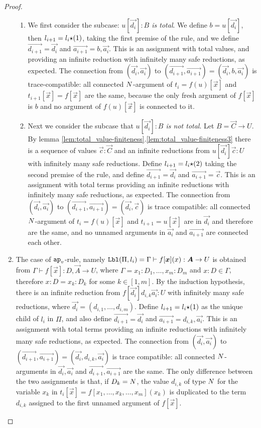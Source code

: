 \begin{proof}
\begin{enumerate}
\begin{enumerate}
\item
  We first consider the subcase: \emph{$u[\vec{d_i}]:B$ is total}.
  We define $b = u[\vec{d_i}]$, then $l_{i+1}=l_i{\star}(1)$, taking the first premise of the rule,
  and we define $\vec{d_{i+1}} = \vec{d_i}$ and $\vec{a_{i+1}} = b,\vec{a_i}$. 
  This is an assignment with total values, and providing an infinite reduction with infinitely many safe
  reductions, as expected. 
  The connection from 
  $(\vec{d_i},\vec{a_i})$ to $(\vec{d_{i+1}},\vec{a_{i+1}}) = (\vec{d_i},b,\vec{a_i})$ is
  trace-compatible: all connected 
  ${N}$-argument of $t_{i}=f(u)[\vec{x}]$ and $t_{i+1}[\vec{x}] = f[\vec{x}]$ are the same,
  because the only fresh argument of $f[\vec{x}]$ 
  is $b$ and no argument of $f(u)[\vec{x}]$ is connected to it.
\item
  Next we consider the subcase that \emph{$u[\vec{d_i}]:B$ is not total}.
  Let $B = \vec{C}\rightarrow U$.
  By lemma \ref{lem:total_value-finiteness}.\ref{lem:total_value-finiteness3}
  there is a sequence of values $\vec{c}:\vec{C}$ and an infinite reductions from 
  $u[\vec{d_i}]\vec{c}: U$ with infinitely many safe reductions.
  Define $l_{i+1}= l_i {\star} (2)$ taking the second premise of the rule,
  and define $\vec{d_{i+1}} = \vec{d_i}$ and $\vec{a_{i+1}} = \vec{c}$. 
  This is an assignment with total terms providing an infinite reductions with 
  infinitely many safe reductions, as expected.
  The connection from 
  $(\vec{d_i},\vec{a_i})$ to $(\vec{d_{i+1}},\vec{a_{i+1}}) = (\vec{d_i},\vec{c})$ is
  trace compatible: all connected ${N}$-argument of $t_{i} = f(u)[\vec{x}]$ and $t_{i+1}=u[\vec{x}]$ are 
  in $\vec{d_i}$ and therefore are the same, and no unnamed arguments in $\vec{a_i}$
  and $\vec{a_{i+1}}$ are connected each other.
 \end{enumerate}

\item
  The case of $\apvar$-rule, namely 
  $\Label(\Pi,l_i) 
  = 
  \Gamma \vdash f[\vec{x}](x): \vec{A}\rightarrow U$ is obtained from
  $\Gamma \vdash f[\vec{x}]: D,\vec{A} \rightarrow U$,
  where $\Gamma=x_1:D_1,\ldots,x_m:D_m$ and $x:D\in\Gamma$, therefore
  $x:D = x_k:D_k$ for some $k \in [1,m]$. 
  By the induction hypothesis, there is an infinite reduction from $f[\vec{d_i}]d_{i,k}\vec{a_i}: U$
  with infinitely many safe reductions,
  where $\vec{d_i} = (d_{i,1},\ldots,d_{i,m})$. 
  Define $l_{i+1}=l_i{\star}(1)$ as the unique child of $l_i$ in $\Pi$, and
  also define $\vec{d_{i+1}} = \vec{d_i}$ and $\vec{a_{i+1}} = d_{i,k},\vec{a_i}$. 
  This is an assignment with total terms providing an infinite reductions with 
  infinitely many safe reductions, as expected.
  The connection from
  $(\vec{d_i},\vec{a_i})$ to
  $(\vec{d_{i+1}},\vec{a_{i+1}}) = (\vec{d_i},d_{i,k},\vec{a_i})$
  is trace compatible: all connected ${N}$-arguments in $\vec{d_i},\vec{a_i}$ and 
  $\vec{d_{i+1}},\vec{a_{i+1}}$ are the same.  
  The only difference between the two assignments
  is that, if $D_k = {N}$, the value $d_{i,k}$ of type ${N}$ for the variable $x_k$
  in $t_i[\vec{x}]=f[x_1,\ldots,x_k,\ldots,x_m](x_k)$ is duplicated to the term $d_{i,k}$ 
  assigned to the first unnamed argument of $ f[\vec{x}]$. 


\end{enumerate}
\end{proof}
